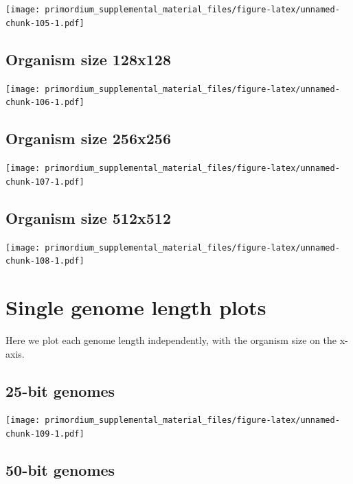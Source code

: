 \documentclass[
]{book}
\begin{document}
\texttt{[image: primordium\_supplemental\_material\_files/figure-latex/unnamed-chunk-105-1.pdf]}

\hypertarget{organism-size-128x128-3}{%
\subsection{Organism size 128x128}\label{organism-size-128x128-3}}

\texttt{[image: primordium\_supplemental\_material\_files/figure-latex/unnamed-chunk-106-1.pdf]}

\hypertarget{organism-size-256x256-3}{%
\subsection{Organism size 256x256}\label{organism-size-256x256-3}}

\texttt{[image: primordium\_supplemental\_material\_files/figure-latex/unnamed-chunk-107-1.pdf]}

\hypertarget{organism-size-512x512-3}{%
\subsection{Organism size 512x512}\label{organism-size-512x512-3}}

\texttt{[image: primordium\_supplemental\_material\_files/figure-latex/unnamed-chunk-108-1.pdf]}

\hypertarget{single-genome-length-plots-1}{%
\section{Single genome length plots}\label{single-genome-length-plots-1}}

Here we plot each genome length independently, with the organism size on the x-axis.

\hypertarget{bit-genomes-5}{%
\subsection{25-bit genomes}\label{bit-genomes-5}}

\texttt{[image: primordium\_supplemental\_material\_files/figure-latex/unnamed-chunk-109-1.pdf]}

\hypertarget{bit-genomes-6}{%
\subsection{50-bit genomes}\label{bit-genomes-6}}
\end{document}
